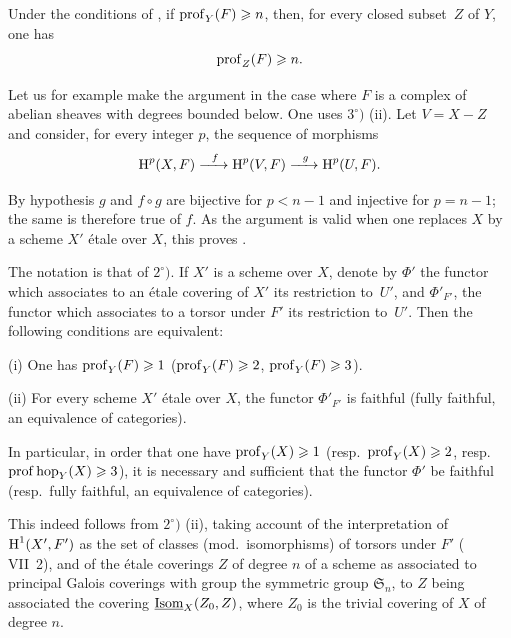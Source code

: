 \begin{corollary} \label{XIV.1.3}
Under the conditions of , if $\operatorname{prof}_Y(F)\geqslant n$, then, for every closed subset~$Z$ of $Y$, one has
$$
\operatorname{prof}_Z(F)\geqslant n.
$$
\end{corollary}

Let us for example make the argument in the case where $F$ is a complex of abelian sheaves with degrees bounded below. One uses  $3^\circ)$ \textup{(ii)}. Let $V=X-Z$ and consider, for every integer $p$, the sequence of morphisms
$$
\H^p(X, F)\lto{f} \H^p(V, F)\lto{g} \H^p(U, F).
$$

By hypothesis $g$ and $f\circ g$ are bijective for $p<n-1$ and injective for $p=n-1$; the same is therefore true of $f$. As the argument is valid when one replaces $X$ by a scheme $X'$ \'etale over $X$, this proves .

\begin{corollary} \label{XIV.1.4} The notation is that of  $2^\circ)$. If $X'$ is a scheme over $X$, denote by $\Phi'$ the functor which associates to an \'etale covering of $X'$ its restriction to~$U'$, and $\Phi'_{F'}$, the functor which associates to a torsor under $F'$ its restriction to~$U'$. Then the following conditions are equivalent:

\textup{(i)} One has $\operatorname{prof}_Y(F)\geqslant 1$ (\resp $\operatorname{prof}_Y(F)\geqslant 2$, \resp $\operatorname{prof}_Y(F)\geqslant 3$).

\textup{(ii)} For every scheme $X'$ \'etale over $X$, the functor $\Phi'_{F'}$ is faithful (\resp fully faithful, \resp an equivalence of categories).

In particular, in order that one have $\operatorname{prof}_Y({X})\geqslant 1$ (resp.\ $\operatorname{prof}_Y({X})\geqslant 2$, resp.\ $\operatorname{prof} \operatorname{hop}_Y(X)\geqslant 3$), it is necessary and sufficient that the functor $\Phi'$ be faithful (resp.\ fully faithful, \resp an equivalence of categories).
\end{corollary}

This indeed follows from  $2^\circ)$ \textup{(ii)}, taking account of the interpretation of $\operatorname{H}^1(X', F')$ as the set of classes (mod.\ isomorphisms) of torsors under $F'$ ( VII~2), and of the \'etale coverings $Z$ of degree $n$ of a scheme as associated to principal Galois coverings with group the symmetric group $\mathfrak{S}_n$, to $Z$ being associated the covering $\underline{\textup{Isom}}_X(Z_0, Z)$, where $Z_0$ is the trivial covering of $X$ of degree $n$.


